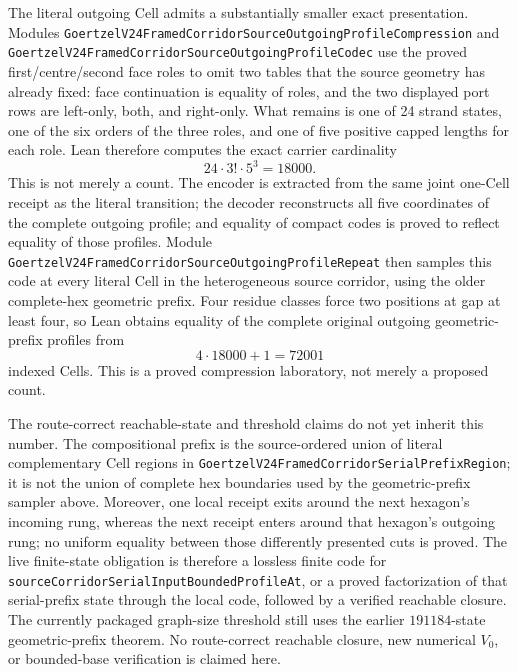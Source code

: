 \documentclass[11pt]{article}
\theoremstyle{definition}
\begin{document}
The literal outgoing Cell admits a substantially smaller exact presentation.
Modules
\texttt{GoertzelV24FramedCorridorSourceOutgoingProfileCompression} and
\texttt{GoertzelV24FramedCorridorSourceOutgoingProfileCodec} use the proved
first/centre/second face roles to omit two tables that the source geometry has
already fixed: face continuation is equality of roles, and the two displayed
port rows are left-only, both, and right-only.  What remains is one of 24
strand states, one of the six orders of the three roles, and one of five
positive capped lengths for each role.  Lean therefore computes the exact
carrier cardinality
\[
  24\cdot 3!\cdot 5^3=18000.
\]
This is not merely a count.  The encoder is extracted from the same joint
one-Cell receipt as the literal transition; the decoder reconstructs all five
coordinates of the complete outgoing profile; and equality of compact codes
is proved to reflect equality of those profiles.  Module
\texttt{GoertzelV24FramedCorridorSourceOutgoingProfileRepeat} then samples this
code at every literal Cell in the heterogeneous source corridor, using the
older complete-hex geometric prefix.  Four residue classes force two positions
at gap at least four, so Lean obtains equality of the complete original
outgoing geometric-prefix profiles from
\[
  4\cdot 18000+1=72001
\]
indexed Cells.  This is a proved compression laboratory, not merely a proposed
count.

The route-correct reachable-state and threshold claims do not yet inherit this
number.  The compositional prefix is the source-ordered union of literal
complementary Cell regions in
\texttt{GoertzelV24FramedCorridorSerialPrefixRegion}; it is not the union of
complete hex boundaries used by the geometric-prefix sampler above.  Moreover,
one local receipt exits around the next hexagon's incoming rung, whereas the
next receipt enters around that hexagon's outgoing rung; no uniform equality
between those differently presented cuts is proved.  The live finite-state
obligation is therefore a lossless finite code for
\texttt{sourceCorridorSerialInputBoundedProfileAt}, or a proved factorization
of that serial-prefix state through the local code, followed by a verified
reachable closure.  The currently packaged graph-size threshold still uses
the earlier $191184$-state geometric-prefix theorem.  No route-correct
reachable closure, new numerical $V_0$, or bounded-base verification is
claimed here.
\end{document}
